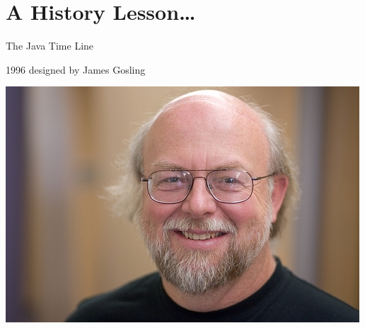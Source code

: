 \section{A History Lesson\ldots}
\begin{frame}{The Java Time Line}
\begin{block}{1996}
 designed by James Gosling
\end{block}
\begin{center}
\includegraphics[scale=0.4]{resources/JamesGosling.jpg}
\end{center}
\end{frame}

